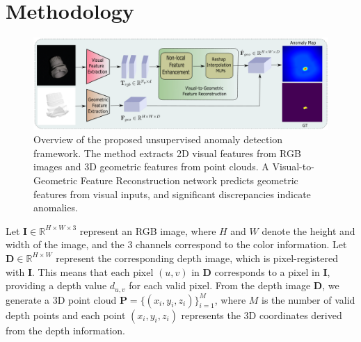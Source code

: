 \section*{Methodology}

\begin{figure}[ht]
\centering
\includegraphics[width=\linewidth]{figs/overview}
\caption{Overview of the proposed unsupervised anomaly detection framework. The method extracts 2D visual features from RGB images and 3D geometric features from point clouds. A Visual-to-Geometric Feature Reconstruction network predicts geometric features from visual inputs, and significant discrepancies indicate anomalies.}
\label{fig:view}
\end{figure}

Let $\mathbf{I} \in \mathbb{R}^{H \times W \times 3}$ represent an RGB image, where $H$ and $W$ denote the height and width of the image, and the 3 channels correspond to the color information. Let $\mathbf{D} \in \mathbb{R}^{H \times W}$ represent the corresponding depth image, which is pixel-registered with $\mathbf{I}$. This means that each pixel $(u, v)$ in $\mathbf{D}$ corresponds to a pixel in $\mathbf{I}$, providing a depth value $d_{u,v}$ for each valid pixel. From the depth image $\mathbf{D}$, we generate a 3D point cloud $\mathbf{P} = \{(x_i, y_i, z_i)\}_{i=1}^{M}$, where $M$ is the number of valid depth points and each point $(x_i, y_i, z_i)$ represents the 3D coordinates derived from the depth information.

